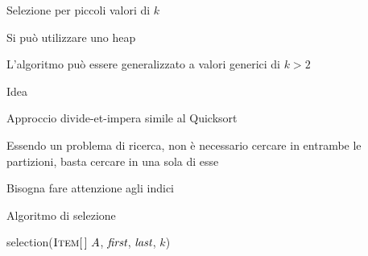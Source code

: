 \begin{frame}{Selezione per piccoli valori di $k$}

\vspace{-9pt}
\begin{myboxtitle}[Intuizione]
\BIL
\item Si può utilizzare uno heap
\item L'algoritmo può essere generalizzato a valori generici di $k > 2$
\EIL
\end{myboxtitle}

\end{frame}
	
\begin{frame}{Idea}

\vspace{-9pt}
\BIL
\item Approccio divide-et-impera simile al Quicksort
\item Essendo un problema di ricerca, non è necessario cercare in entrambe le partizioni, basta cercare in una sola di esse
\item Bisogna fare attenzione agli indici
\EIL

\end{frame}

\begin{frame}{Algoritmo di selezione}

\vspace{-12pt}
\small
\begin{Procedure}
\caption[A]{\Item \textsf{selection}($\textsc{Item}[\,]\ A$, \INTEGER $\textit{first}$, \INTEGER $\textit{last}$, \INTEGER $k$)}
\end{Procedure}
\vspace{-18pt}

\end{frame}

